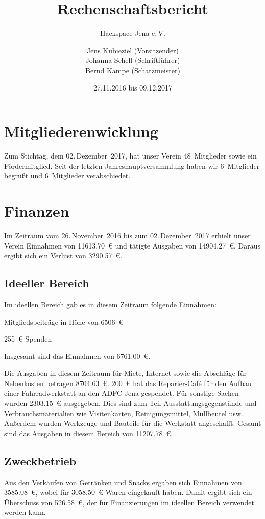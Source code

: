 \documentclass[ngerman]{scrartcl}
\title{Rechenschaftsbericht}
\subtitle{Hackspace Jena e.\,V.}
\author{%
	Jens Kubieziel (Vorsitzender)\\
	Johanna Schell (Schriftführer)\\
	Bernd Kampe (Schatzmeister)
}
\date{27.11.2016 bis 09.12.2017}
\begin{document}
\maketitle{}

\tableofcontents{}

\newpage{}

\section{Mitgliederenwicklung}

Zum Stichtag, dem 02.\,Dezember~2017, hat unser Verein 48~Mitglieder sowie ein Fördermitglied.
Seit der letzten Jahreshauptversammlung haben wir 6~Mitglieder begrüßt und 6~Mitglieder verabschiedet.

\section{Finanzen}

Im Zeitraum vom 26.\,November~2016 bis zum 02.\,Dezember~2017 erhielt unser Verein Einnahmen von \num{11613,70}~\euro{} und tätigte Ausgaben von \num{14904,27}~\euro{}.
Daraus ergibt sich ein Verlust von \num{3290,57}~\euro{}.


\subsection{Ideeller Bereich}
\label{sec:ideeller_bereich}

Im ideellen Bereich gab es in diesem Zeitraum folgende Einnahmen:
\begin{compactitem}
\item Mitgliedsbeiträge in Höhe von \num{6506}~\euro{}
\item \num{255}~\euro{} Spenden
\end{compactitem}
Insgesamt sind das Einnahmen von \num{6761,00}~\euro{}.

Die Ausgaben in diesem Zeitraum für Miete, Internet sowie die Abschläge für Nebenkosten betragen \num{8704,63}~\euro{}.
\num{200}~\euro{} hat das Reparier-Café für den Aufbau einer Fahrradwerkstatt an den ADFC Jena gespendet.
Für sonstige Sachen wurden \num{2303,15}~\euro{} ausgegeben.
Dies sind zum Teil Ausstattungsgegenstände und Verbrauchsmaterialien wie Visitenkarten, Reinigungsmittel, Müllbeutel usw.
Außerdem wurden Werkzeuge und Bauteile für die Werkstatt angeschafft.
Gesamt sind das Ausgaben in diesem Bereich von \num{11207,78}~\euro{}.

\subsection{Zweckbetrieb}
\label{sec:Zweckbetrieb}
Aus den Verkäufen von Getränken und Snacks ergaben sich Einnahmen von \num{3585,08}~\euro{}, wobei für \num{3058,50}~\euro{} Waren eingekauft haben.
Damit ergibt sich ein Überschuss von \num{526,58}~\euro{}, der für Finanzierungen im ideellen Bereich verwendet werden kann.
\end{document}
